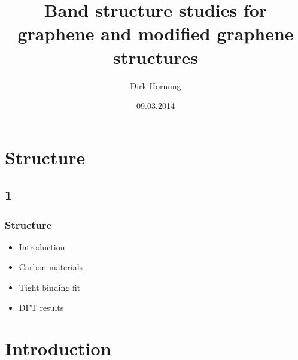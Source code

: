 \documentclass{beamer}
\title{Band structure studies for graphene and modified graphene structures}
\author{Dirk Hornung}
\date{09.03.2014}
\begin{document}
\begin{frame}[plain]
	\titlepage
\end{frame}

\section*{Structure}
\subsection*{1}

		 
		
		
	




\begin{frame}
	\frametitle{Structure}
	\begin{itemize}
		\item Introduction
		\vspace{0.3cm}
		\item Carbon materials
		\vspace{0.3cm}
		\item Tight binding fit
		\vspace{0.3cm}
		\item DFT results
	\end{itemize}
\end{frame}

\section{Introduction}
\end{document}
